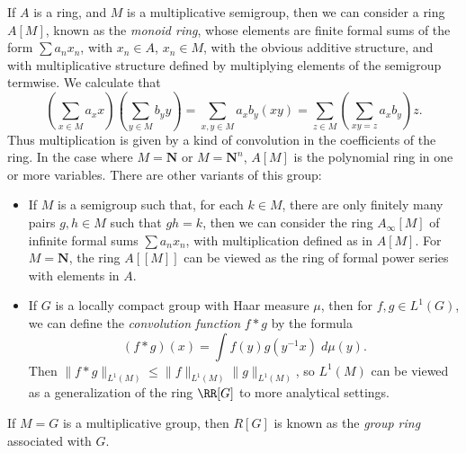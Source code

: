 \begin{example}
    If $A$ is a ring, and $M$ is a multiplicative semigroup, then we can consider a ring $A[M]$, known as the \emph{monoid ring}, whose elements are finite formal sums of the form $\sum a_n x_n$, with $x_n \in A$, $x_n \in M$, with the obvious additive structure, and with multiplicative structure defined by multiplying elements of the semigroup termwise. We calculate that
    \[ \left( \sum_{x \in M} a_x x \right) \left( \sum_{y \in M} b_y y \right) = \sum_{x,y \in M} a_x b_y (xy) = \sum_{z \in M} \left( \sum_{xy = z} a_x b_y \right) z. \]
    Thus multiplication is given by a kind of convolution in the coefficients of the ring. In the case where $M = \mathbf{N}$ or $M = \mathbf{N}^n$, $A[M]$ is the polynomial ring in one or more variables. There are other variants of this group:
    \begin{itemize}
        \item If $M$ is a semigroup such that, for each $k \in M$, there are only finitely many pairs $g,h \in M$ such that $gh = k$, then we can consider the ring $A_\infty[M]$ of infinite formal sums $\sum a_n x_n$, with multiplication defined as in $A[M]$. For $M = \mathbf{N}$, the ring $A[[M]]$ can be viewed as the ring of formal power series with elements in $A$.

        \item If $G$ is a locally compact group with Haar measure $\mu$, then for $f,g \in L^1(G)$, we can define the \emph{convolution function} $f * g$ by the formula
        \[ (f * g)(x) = \int f(y) g(y^{-1} x)\; d\mu(y). \]
        Then $\| f * g \|_{L^1(M)} \leq \| f \|_{L^1(M)} \| g \|_{L^1(M)}$, so $L^1(M)$ can be viewed as a generalization of the ring $\RR[G]$ to more analytical settings.
    \end{itemize}
    If $M = G$ is a multiplicative group, then $R[G]$ is known as the \emph{group ring} associated with $G$.
\end{example}

